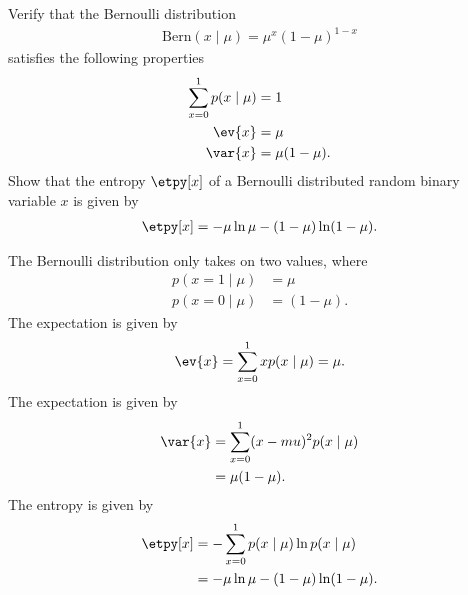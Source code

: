\begin{question}{2.1}
	Verify that the Bernoulli distribution
	\begin{align*}
		\mathrm{Bern}(x \mid \mu) = \mu^{x}(1-\mu)^{1-x}
	\end{align*}
	satisfies the following properties
	\begin{align*}
		\sum_{x = 0}^{1} p(x \mid \mu) &= 1\\
		\ev{x} &= \mu\\
		\var{x} &= \mu(1-\mu).
	\end{align*}
	Show that the entropy $\etpy[x]$ of a Bernoulli distributed random binary variable $x$ is given by
	\begin{align*}
		\etpy[x] = -\mu \ln \mu - (1-\mu) \ln (1-\mu).
	\end{align*}
\end{question}

\begin{answer}{}
	The Bernoulli distribution only takes on two values, where
	\begin{align}
		p(x = 1 \mid \mu) &= \mu\\
		p(x = 0 \mid \mu) &= (1-\mu).
	\end{align}
	The expectation is given by
	\begin{align}
		\ev{x} = \sum_{x = 0}^{1} xp(x \mid \mu) = \mu.
	\end{align}
	The expectation is given by
	\begin{align}
		\var{x} &= \sum_{x = 0}^{1} (x - mu)^2 p(x \mid \mu)\\
		&= \mu(1-\mu).
	\end{align}
	The entropy is given by
	\begin{align}
		\etpy[x] &= -\sum_{x = 0}^{1}p(x \mid \mu) \ln p(x \mid \mu)\\
		&= -\mu \ln \mu - (1-\mu)\ln(1-\mu).
	\end{align}
\end{answer}
